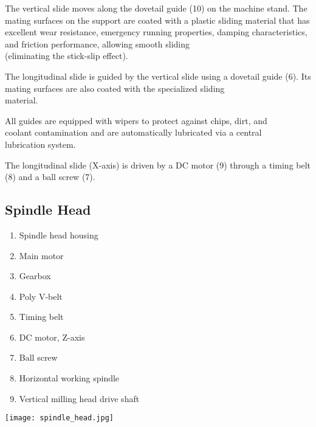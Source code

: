 \vspace{.3cm}

\noindent The vertical slide moves along the dovetail guide (10) on the machine stand. The mating surfaces on the support are coated with a plastic sliding material that has excellent wear resistance, emergency running properties, damping characteristics, and friction performance, allowing smooth sliding \\(eliminating the stick-slip effect).

\vspace{.3cm}

\noindent The longitudinal slide is guided by the vertical slide using a dovetail guide (6). Its mating surfaces are also coated with the specialized sliding \\material.

\vspace{.3cm}

\noindent All guides are equipped with wipers to protect against chips, dirt, and \\coolant contamination and are automatically lubricated via a central \\lubrication system.

\vspace{.3cm}

\noindent The longitudinal slide (X-axis) is driven by a DC motor (9) through a timing belt (8) and a ball screw (7).

\vfill
\clearpage

\subsection{Spindle Head}

\begin{minipage}{0.5\textwidth}
    \begin{enumerate}[itemsep=1pt,parsep=0pt]
        \item Spindle head housing
        \item Main motor
        \item Gearbox
        \item Poly V-belt
        \item Timing belt
        \item DC motor, Z-axis
        \item Ball screw
        \item Horizontal working spindle
        \item Vertical milling head drive shaft
    \end{enumerate}
\end{minipage}%
\begin{minipage}{0.5\textwidth}
    \centering
    \texttt{[image: spindle\_head.jpg]}
    \label{fig:spindle_head}
\end{minipage}

